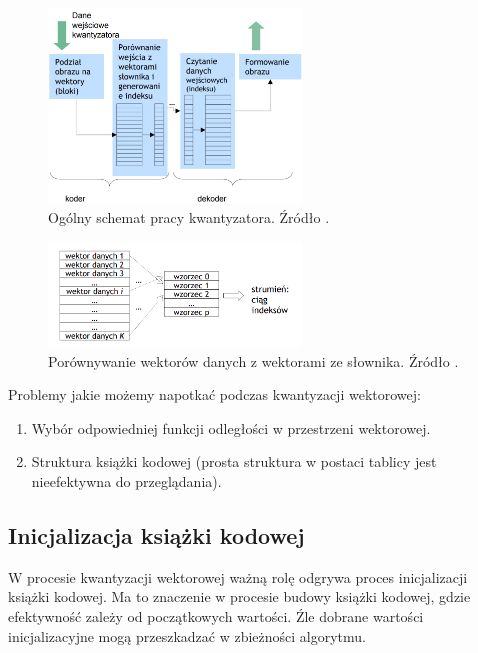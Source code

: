 \documentclass{article}
\begin{document}
\begin{figure}[H]
  \centering
  \includegraphics[width=0.6\textwidth]{images/schemat_kwantyzatora.png}
  \caption{Ogólny schemat pracy kwantyzatora. Źródło \cite{mwilczewski}.}
  \label{fig:schemat_kwantyzatora}
\end{figure}

\begin{figure}[H]
  \centering
  \includegraphics[width=0.6\textwidth]{images/wektory_danych.png}
  \caption{Porównywanie wektorów danych z wektorami ze słownika. Źródło \cite{mwilczewski}.}
  \label{fig:wektory_danych}
\end{figure}

Problemy jakie możemy napotkać podczas kwantyzacji wektorowej:
\begin{enumerate}
  \item Wybór odpowiedniej funkcji odległości w przestrzeni wektorowej.
  \item Struktura książki kodowej (prosta struktura w postaci tablicy jest nieefektywna do przeglądania).
\end{enumerate}

\subsection{Inicjalizacja książki kodowej}

W procesie kwantyzacji wektorowej ważną rolę odgrywa proces inicjalizacji książki kodowej.
Ma to znaczenie w procesie budowy książki kodowej, gdzie efektywność zależy od początkowych wartości.
Źle dobrane wartości inicjalizacyjne mogą przeszkadzać w zbieżności algorytmu.
\end{document}
